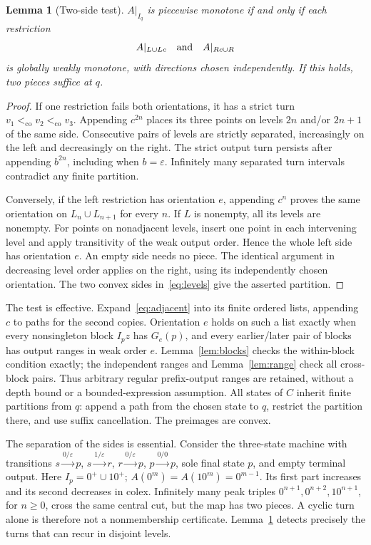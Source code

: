 \documentclass[acmsmall,screen,nonacm,11pt]{acmart}
\newcommand{\eps}{\varepsilon}
\newcommand{\co}{\mathrel{<_{\mathrm{co}}}}
\newtheorem{lemma}[theorem]{Lemma}
\theoremstyle{definition}
\begin{document}
\begin{lemma}[Two-side test]\label{lem:cycle}
$A|_{I_q}$ is piecewise monotone if and only if each restriction
\begin{equation}\label{eq:adjacent}
 A|_{L\cup Lc}\quad\hbox{and}\quad A|_{Rc\cup R}
\end{equation}
is globally weakly monotone, with directions chosen independently.
If this holds, two pieces suffice at $q$.
\end{lemma}
\begin{proof}
If one restriction fails both orientations, it has a strict turn
$v_1\co v_2\co v_3$. Appending $c^{2n}$ places its three points on levels
$2n$ and/or $2n+1$ of the same side. Consecutive pairs of levels are strictly
separated, increasingly on the left and decreasingly on the right.
The strict output turn persists after appending $b^{2n}$, including when
$b=\eps$. Infinitely many separated turn intervals contradict any finite
partition.

Conversely, if the left restriction has orientation $e$, appending $c^n$
proves the same orientation on $L_n\cup L_{n+1}$ for every $n$. If $L$ is
nonempty, all its levels are nonempty. For points on nonadjacent levels,
insert one point in each intervening level and apply transitivity of the
weak output order. Hence the whole left side has orientation $e$. An empty
side needs no piece. The identical argument in decreasing level order
applies on the right, using its independently chosen orientation. The two
convex sides in~\eqref{eq:levels} give the asserted partition.
\end{proof}

The test is effective. Expand~\eqref{eq:adjacent} into its finite ordered
lists, appending $c$ to paths for the second copies. Orientation $e$ holds
on such a list exactly when every nonsingleton block $I_pz$ has $G_e(p)$,
and every earlier/later pair of blocks has output ranges in weak order $e$.
Lemma~\ref{lem:blocks} checks the within-block condition exactly; the
independent ranges and Lemma~\ref{lem:range} check all cross-block pairs.
Thus arbitrary regular prefix-output ranges are retained, without a depth
bound or a bounded-expression assumption. All states of $C$ inherit finite
partitions from $q$: append a path from the chosen state to $q$, restrict
the partition there, and use suffix cancellation. The preimages are convex.

The separation of the sides is essential. Consider the three-state machine
with transitions $s\xrightarrow{0/\eps}p$,
$s\xrightarrow{1/\eps}r$, $r\xrightarrow{0/\eps}p$,
$p\xrightarrow{0/0}p$, sole final state $p$, and empty terminal output.
Here $I_p=0^+\cup10^+$; $A(0^m)=A(10^m)=0^{m-1}$.
Its first part increases and its second decreases in colex. Infinitely many
peak triples $0^{n+1},0^{n+2},10^{n+1}$, for $n\geq0$, cross the same
central cut, but the map has two pieces. A cyclic turn alone is therefore
not a nonmembership certificate. Lemma~\ref{lem:cycle} detects precisely
the turns that can recur in disjoint levels.
\end{document}
